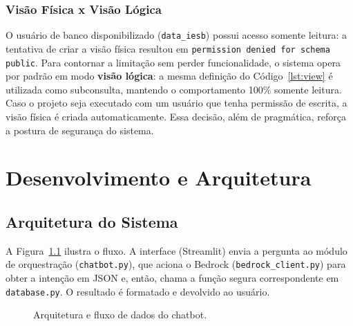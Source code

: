 \documentclass[
    12pt,
    oneside,
    a4paper,
    chapter=TITLE,
    section=TITLE
]{abntex2}
\begin{document}
\subsection{Visão Física x Visão Lógica}
O usuário de banco disponibilizado (\texttt{data\_iesb}) possui acesso somente leitura: a tentativa
de criar a visão física resultou em \texttt{permission denied for schema public}. Para contornar a
limitação sem perder funcionalidade, o sistema opera por padrão em modo \textbf{visão lógica}: a
mesma definição do Código~\ref{lst:view} é utilizada como subconsulta, mantendo o comportamento
100\% somente leitura. Caso o projeto seja executado com um usuário que tenha permissão de escrita,
a visão física é criada automaticamente. Essa decisão, além de pragmática, reforça a postura de
segurança do sistema.

\chapter{Desenvolvimento e Arquitetura}

\section{Arquitetura do Sistema}
A Figura~\ref{fig:arq} ilustra o fluxo. A interface (Streamlit) envia a pergunta ao módulo de
orquestração (\texttt{chatbot.py}), que aciona o Bedrock (\texttt{bedrock\_client.py}) para obter a
intenção em JSON e, então, chama a função segura correspondente em \texttt{database.py}. O resultado
é formatado e devolvido ao usuário.

\begin{figure}[H]
\centering
\setlength{\fboxsep}{8pt}
\caption{Arquitetura e fluxo de dados do chatbot.}
\label{fig:arq}
\end{figure}
\end{document}
